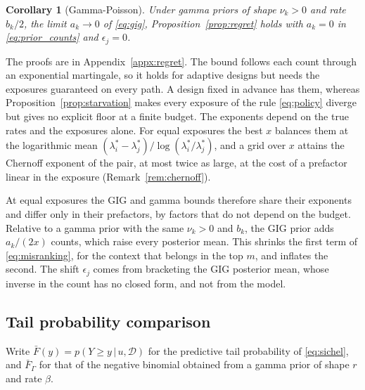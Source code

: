 \documentclass[twoside]{article}
\newcommand\given[1][]{\,#1\vert\,}
\theoremstyle{plain}
\newtheorem{corollary}{Corollary}
\theoremstyle{definition}
\theoremstyle{remark}
\begin{document}
\begin{corollary}[Gamma-Poisson]
    \label{cor:regret_gamma}
    Under gamma priors of shape $\nu_k > 0$ and rate $b_k / 2$, the limit $a_k \to 0$ of \eqref{eq:gig}, Proposition~\ref{prop:regret} holds with $a_k = 0$ in \eqref{eq:prior_counts} and $\epsilon_j = 0$.
\end{corollary}

The proofs are in Appendix~\ref{appx:regret}.
The bound follows each count through an exponential martingale, so it holds for adaptive designs but needs the exposures guaranteed on every path.
A design fixed in advance has them, whereas Proposition~\ref{prop:starvation} makes every exposure of the rule \eqref{eq:policy} diverge but gives no explicit floor at a finite budget.
The exponents depend on the true rates and the exposures alone.
For equal exposures the best $x$ balances them at the logarithmic mean $(\lambda^{*}_i - \lambda^{*}_j) / \log(\lambda^{*}_i / \lambda^{*}_j)$, and a grid over $x$ attains the Chernoff exponent of the pair, at most twice as large, at the cost of a prefactor linear in the exposure (Remark~\ref{rem:chernoff}).

At equal exposures the GIG and gamma bounds therefore share their exponents and differ only in their prefactors, by factors that do not depend on the budget.
Relative to a gamma prior with the same $\nu_k > 0$ and $b_k$, the GIG prior adds $a_k / (2x)$ counts, which raise every posterior mean.
This shrinks the first term of \eqref{eq:misranking}, for the context that belongs in the top $m$, and inflates the second.
The shift $\epsilon_j$ comes from bracketing the GIG posterior mean, whose inverse in the count has no closed form, and not from the model.

\subsection{Tail probability comparison}

Write $\bar{F}(y) = p(Y \geq y \given u, \mathcal{D})$ for the predictive tail probability of \eqref{eq:sichel}, and $\bar{F}_{\Gamma}$ for that of the negative binomial obtained from a gamma prior of shape $r$ and rate $\beta$.
\end{document}
